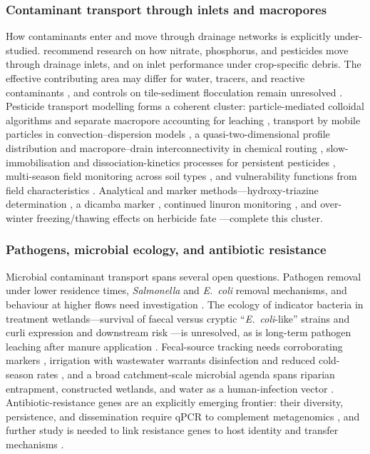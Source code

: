 \subsubsection{Contaminant transport through inlets and macropores}

How contaminants enter and move through drainage networks is explicitly
under-studied. \textcite{Li2017b} recommend research on how nitrate, phosphorus,
and pesticides move through drainage inlets, and on inlet performance under
crop-specific debris. The effective contributing area may differ for water,
tracers, and reactive contaminants \parencite{Akay2008}, and controls on
tile-sediment flocculation remain unresolved \parencite{Stone1997}. Pesticide
transport modelling forms a coherent cluster: particle-mediated colloidal
algorithms and separate macropore accounting for leaching \parencite{Wendell2024},
transport by mobile particles in convection--dispersion models \parencite{Zehe2001},
a quasi-two-dimensional profile distribution and macropore--drain interconnectivity
in chemical routing \parencite{Fox2007b}, slow-immobilisation and
dissociation-kinetics processes for persistent pesticides \parencite{Novak2003},
multi-season field monitoring across soil types \parencite{Dousset2004}, and
vulnerability functions from field characteristics \parencite{Leu2004}. Analytical
and marker methods---hydroxy-triazine determination \parencite{MUIR1978}, a dicamba
marker \parencite{Heaven2012}, continued linuron monitoring \parencite{Gordon2005},
and over-winter freezing/thawing effects on herbicide fate \parencite{Siimes2006}
---complete this cluster.

\subsubsection{Pathogens, microbial ecology, and antibiotic resistance}

Microbial contaminant transport spans several open questions. Pathogen removal
under lower residence times, \textit{Salmonella} and \textit{E.\ coli} removal
mechanisms, and behaviour at higher flows need investigation
\parencite{Soupir2018}. The ecology of indicator bacteria in treatment
wetlands---survival of faecal versus cryptic ``\textit{E.\ coli}-like'' strains
\parencite{Stott2023} and curli expression and downstream risk
\parencite{Truhlar2015}---is unresolved, as is long-term pathogen leaching after
manure application \parencite{Malik2004}. Fecal-source tracking needs
corroborating markers \parencite{Gottschall2013}, irrigation with wastewater
warrants disinfection and reduced cold-season rates \parencite{Ding2021}, and a
broad catchment-scale microbial agenda spans riparian entrapment, constructed
wetlands, and water as a human-infection vector \parencite{Collins2007}.
Antibiotic-resistance genes are an explicitly emerging frontier: their diversity,
persistence, and dissemination require qPCR to complement metagenomics
\parencite{Smith2019b}, and further study is needed to link resistance genes to
host identity and transfer mechanisms \parencite{Rieke2018}.

